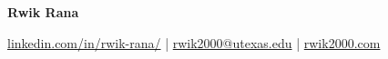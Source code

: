 \documentclass[11pt]{article}
\begin{document}
\pagestyle{empty}



\def\summ{1}

    {\textbf{\Huge Rwik Rana}}


    
    \href{https://www.linkedin.com/in/rwik-rana/}{linkedin.com/in/rwik-rana/} |
     \href{mailto:rwik2000@utexas.edu}{rwik2000@utexas.edu} |
     \href{https://rwik2000.com}{rwik2000.com}
     \vspace{2pt}


% 


% 




% 

% 
% 
\end{document}
